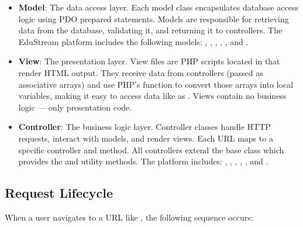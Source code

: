 \documentclass[12pt,a4paper]{report}
\begin{document}
\begin{itemize}
    \item \textbf{Model}: The data access layer. Each model class encapsulates database access logic using PDO prepared statements. Models are responsible for retrieving data from the database, validating it, and returning it to controllers. The EduStream platform includes the following models: , , , , , and .
    
    \item \textbf{View}: The presentation layer. View files are PHP scripts located in  that render HTML output. They receive data from controllers (passed as associative arrays) and use PHP's  function to convert those arrays into local variables, making it easy to access data like  as . Views contain no business logic — only presentation code.
    
    \item \textbf{Controller}: The business logic layer. Controller classes handle HTTP requests, interact with models, and render views. Each URL maps to a specific controller and method. All controllers extend the base  class which provides the  and  utility methods. The platform includes: , , , , , and .
\end{itemize}

\subsection{Request Lifecycle}

When a user navigates to a URL like , the following sequence occurs:
\end{document}
